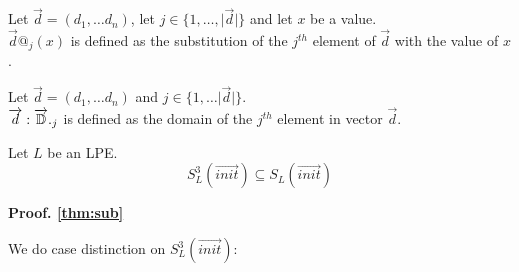 \index{}\documentclass[a4paper,10pt]{article}
\theoremstyle{plain}
\theoremstyle{definition}
\newcommand{\ovr}{\overrightarrow}
\newcommand{\tb}{\textbf}
\begin{document}
\begin{defn}[$@$] Let $\ovr{d} = (d_1, \dots d_n)$, let $j \in \lbrace 1, \ldots , \vert \ovr{d} \vert \rbrace$ and let $x$ be a value.\\
$\ovr{d}@_j(x)$ is defined as the substitution of the $j^{th}$ element of $\ovr{d}$ with the value of $x$.
\end{defn}

\begin{defn}[$\ovr{d}:\ovr{\Bbb{D}}._j$] Let $\ovr{d} = (d_1, \dots d_n)$ and $j \in \lbrace 1, \ldots \vert \ovr{d} \vert \rbrace$.\\
$\ovr{d}:\ovr{\Bbb{D}}._j$ is defined as the domain of the $j^{th}$ element in vector $\ovr{d}$.
\end{defn}

\begin{thm} Let $L$ be an LPE. \label{thm:sub}
$$S_L^3(\ovr{init}) \subseteq S_L(\ovr{init}) $$
\end{thm} 
\begin{flushleft}

\tb{Proof. \ref{thm:sub}}
\end{flushleft}
We do case distinction on $S_L^3(\ovr{init})$:\\
\end{document}
